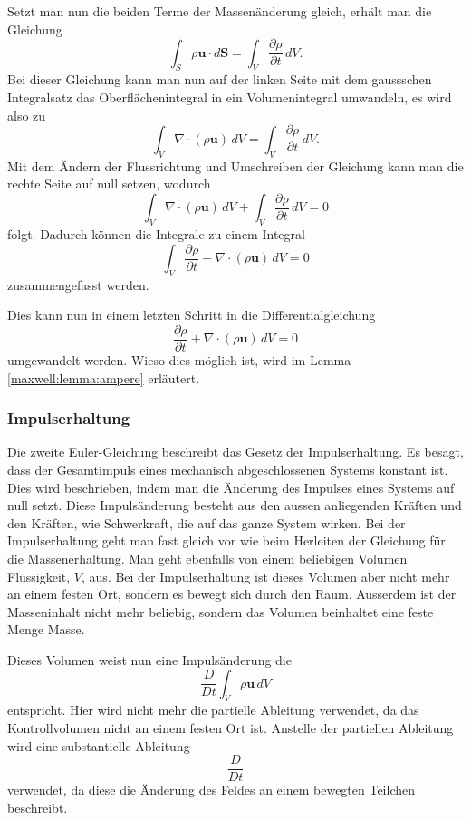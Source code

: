 Setzt man nun die beiden Terme der Massenänderung gleich, erhält man die Gleichung 
\[\int_{S}\rho\mathbf{u}\cdot d\mathbf{S} 
=
\int_{V} \frac{\partial \rho}{\partial t} \, dV .\] 
Bei dieser Gleichung kann man nun auf der linken Seite mit dem gaussschen Integralsatz das Oberflächenintegral in ein Volumenintegral umwandeln, es wird also zu
%
%
\[\int_{V}\nabla\cdot(\rho\mathbf{u}) \, dV
=
\int_{V}\frac{\partial \rho}{\partial t}  \, dV .\]
Mit dem Ändern der Flussrichtung und Umschreiben der Gleichung kann man die rechte Seite auf null setzen, wodurch 
\[\int_{V}\nabla\cdot(\rho\mathbf{u})  \, dV + \int_{V}\frac{\partial \rho}{\partial t}  \, dV 
= 
0\] 
folgt.
Dadurch können die Integrale zu einem Integral
\[\int_{V} \frac{\partial \rho}{\partial t} + \nabla\cdot(\rho\mathbf{u})  \, dV 
= 
0\]
zusammengefasst werden.

Dies kann nun in einem letzten Schritt in die Differentialgleichung
\begin{equation}
\label{openfoam:euler1}
\frac{\partial \rho}{\partial t} + \nabla\cdot(\rho\mathbf{u})  \, dV 
= 
0
\end{equation}
umgewandelt werden.
Wieso dies möglich ist, wird im Lemma \ref{maxwell:lemma:ampere} erläutert.

\subsubsection{Impulserhaltung}
Die zweite Euler-Gleichung beschreibt das Gesetz der Impulserhaltung. 
%
Es besagt, dass der Gesamtimpuls eines mechanisch abgeschlossenen Systems konstant ist.
Dies wird beschrieben, indem man die Änderung des Impulses eines Systems auf null setzt.
Diese Impulsänderung besteht aus den aussen anliegenden Kräften und den Kräften, wie Schwerkraft, die auf das ganze System wirken.
Bei der Impulserhaltung geht man fast gleich vor wie beim Herleiten der Gleichung für die Massenerhaltung.
Man geht ebenfalls von einem beliebigen Volumen Flüssigkeit, $V$, aus.
Bei der Impulserhaltung ist dieses Volumen aber nicht mehr an einem festen Ort, sondern es bewegt sich durch den Raum.
Ausserdem ist der Masseninhalt nicht mehr beliebig, sondern das Volumen beinhaltet eine feste Menge Masse.

Dieses Volumen weist nun eine Impulsänderung die
\[\frac{D}{Dt}\int_{V}\rho\mathbf{u}\, dV\]
entspricht.
Hier wird nicht mehr die partielle Ableitung verwendet, da das Kontrollvolumen nicht an einem festen Ort ist.
Anstelle der partiellen Ableitung wird eine substantielle Ableitung \[\frac{D}{Dt}\] verwendet, da diese die Änderung des Feldes an einem bewegten Teilchen beschreibt.

